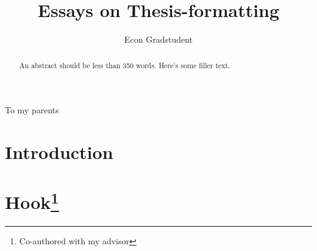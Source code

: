 \documentclass[11pt]{gsasthesis} %
\title{Essays on Thesis-formatting} %
\author{Econ Gradstudent} %
\begin{document}


\thesistitlepage
\copyrightpage
\begin{abstract}
  An abstract should be less than 350 words. Here's some filler text. \blindtext
\end{abstract}

\renewcommand{\contentsname}{\protect\centering\protect\Large Contents}
\renewcommand{\listtablename}{\protect\centering\protect\Large List of Tables}
\renewcommand{\listfigurename}{\protect\centering\protect\Large List of Figures}

\tableofcontents %

\listoftables
\listoffigures
\begin{acknowledgments}
  \blindtext
\end{acknowledgments}
\begin{dedication}
  To my parents
\end{dedication}



\chapter*{Introduction}\label{ch:intro}


\chapter{Hook\texorpdfstring{\footnote{Co-authored with my advisor}}{}}\label{ch:1}

\end{document}
